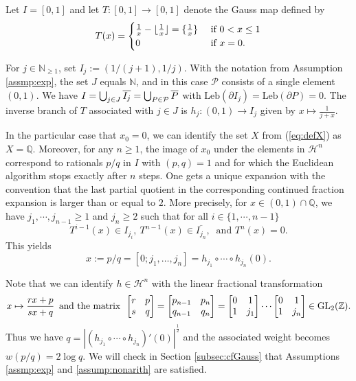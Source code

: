 \documentclass[12pt,a4paper,reqno]{amsart}
\begin{document}
\begin{example} \label{ex:intro:gauss}
Let  $I=[0,1]$ and  let $T:[0,1] \to [0,1]$ denote the Gauss map 
defined by 
$$
T(x) =
\begin{cases}
\frac{1}{x} - \lfloor \frac{1}{x}\rfloor = \{\frac{1}{x}\}  & \hbox{ if } 0 < x \leq 1\\
0 &  \hbox{ if } x=0 .
\end{cases}
$$

For $j \in \mathbb N_{\geq1}$, set $I_j:=(1/(j+1), 1/j)$.  With the notation from Assumption \ref{assmp:exp}, the set $J$  equals $\mathbb N$, and  in this case $\mathcal P$ consists of a single element $(0,1)$. We have $I=\bigcup_{j \in J} \overline{I_j}=\bigcup_{P \in {\mathcal P}} \overline{P}$ with $\mathrm{Leb}(\partial I_j)=\mathrm{Leb}(\partial P)=0$.  The inverse branch of $T$ associated with $j \in J$  is $h_j: (0,1) \to I_j$ given by $x \mapsto \frac{1}{j+x}$.

 In the particular case that $x_0=0$, we can identify  the set $X $ from (\ref{eq:defX}) as $X= \mathbb Q$.  Moreover, for any $ n \geq1$, the image of $x_0$ under the elements in $\mathcal{H}^n$  correspond to rationals $p/q $ in $I$  with $(p,q)=1$ and for which the Euclidean algorithm stops   exactly after  $n$ steps.
 One gets a unique expansion 
 with the convention that the  last partial quotient in the corresponding  continued fraction expansion is  larger than or equal to $2$. More precisely, 
  for $x \in (0,1) \cap \mathbb{Q}$, we have  $j_1, \cdots, j_{n-1} \geq 1$ and $j_n \geq 2$ such that for all $i \in \{1, \cdots, n-1\}$
\[ T^{i-1}(x) \in I_{j_i}, \  T^{n-1}(x) \in \overline{I_{j_n}}, \  \mbox{ and } T^n(x)=0 .\]
 This yields
\[ x:=p/q=[0; j_1, \ldots, j_n] = h_{j_1} \circ \cdots \circ h_{j_n} (0).
\]

Note that we can identify $h \in \mathcal{H}^n$ with the linear fractional transformation 
\[
x \mapsto \frac{rx+p}{sx+q}  \, \text{ and the matrix } \, \begin{bmatrix} r & p \\ s & q \end{bmatrix} =\begin{bmatrix} p_{n-1} & {p_{n}}\\ q_{n-1} & {q_n} \end{bmatrix}=\begin{bmatrix} 0 & 1 \\ 1 & j_1 \end{bmatrix} \cdots \begin{bmatrix} 0 & 1 \\ 1 & j_n \end{bmatrix} \in {\rm GL}_2({\mathbb Z}).
\]
 Thus we have $q=|(h_{j_1} \circ \cdots \circ h_{j_n})'(0)|^{\frac{1}{2}}$ and the associated weight becomes $w(p/q) = 2 \log q$.
We will check in Section \ref{subsec:cfGauss} that Assumptions \ref{assmp:exp} and \ref{assump:nonarith} are satisfied.
\end{example}
\end{document}
